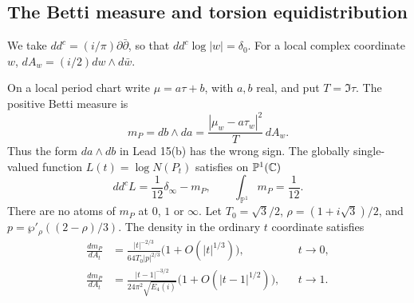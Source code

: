 
\subsection{The Betti measure and torsion equidistribution}

We take $dd^c=(i/\pi)\partial\bar\partial$, so that
$dd^c\log|w|=\delta_0$. For a local complex coordinate $w$,
$dA_w=(i/2)dw\wedge d\bar w$.

\begin{statement}
On a local period chart write $\mu=a\tau+b$, with $a,b$ real,
and put $T=\Im\tau$. The positive Betti measure is
\[
 m_P=db\wedge da
 =\frac{|\mu_w-a\tau_w|^2}{T}\,dA_w.
\]
Thus the form $da\wedge db$ in Lead 15(b) has the wrong sign.
The globally single-valued function $L(t)=\log N(P_t)$ satisfies
on $\mathbb P^1(\mathbb C)$
\begin{equation}\label{eq:ca-current}
 dd^cL=\frac1{12}\delta_\infty-m_P,\qquad
               \int_{\mathbb P^1}m_P=\frac1{12}.
\end{equation}
There are no atoms of $m_P$ at $0$, $1$ or $\infty$.
Let $T_0=\sqrt3/2$, $\rho=(1+i\sqrt3)/2$, and
$p=\wp'_\rho((2-\rho)/3)$. The density in the ordinary
$t$ coordinate satisfies
\begin{align}
 \frac{dm_P}{dA_t}
 &=\frac{|t|^{-2/3}}{64T_0|p|^{2/3}}
                      \bigl(1+O(|t|^{1/3})\bigr),
                         &&t\longrightarrow0,\label{eq:ca-density0}\\
 \frac{dm_P}{dA_t}
 &=\frac{|t-1|^{-3/2}}{24\pi^2\sqrt{E_4(i)}}
                      \bigl(1+O(|t-1|^{1/2})\bigr),
                         &&t\longrightarrow1.\label{eq:ca-density1}
\end{align}
\end{statement}
